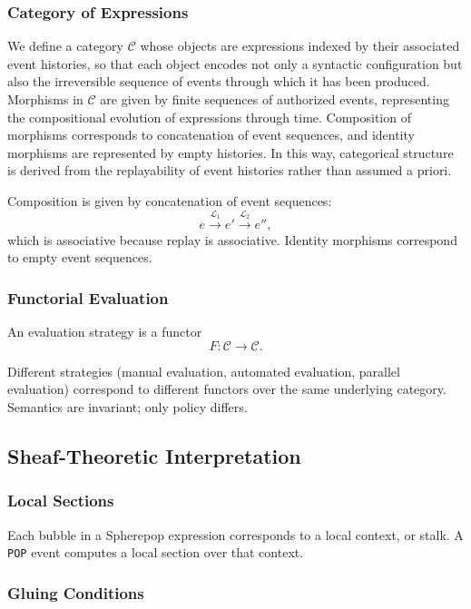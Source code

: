 \documentclass[11pt]{article}
\begin{document}
\subsubsection{Category of Expressions}

We define a category $\mathcal{C}$ whose objects are expressions indexed by their associated event histories, so that each object encodes not only a syntactic configuration but also the irreversible sequence of events through which it has been produced. Morphisms in $\mathcal{C}$ are given by finite sequences of authorized events, representing the compositional evolution of expressions through time. Composition of morphisms corresponds to concatenation of event sequences, and identity morphisms are represented by empty histories. In this way, categorical structure is derived from the replayability of event histories rather than assumed a priori.

Composition is given by concatenation of event sequences:
\[
e \xrightarrow{\mathcal{L}_1} e' \xrightarrow{\mathcal{L}_2} e'',
\]
which is associative because replay is associative. Identity morphisms correspond to empty event sequences.

\subsubsection{Functorial Evaluation}

An evaluation strategy is a functor
\[
F : \mathcal{C} \to \mathcal{C}.
\]

Different strategies (manual evaluation, automated evaluation, parallel evaluation) correspond to different functors over the same underlying category. Semantics are invariant; only policy differs.

\subsection{Sheaf-Theoretic Interpretation}

\subsubsection{Local Sections}

Each bubble in a Spherepop expression corresponds to a local context, or stalk. A \texttt{POP} event computes a local section over that context.

\subsubsection{Gluing Conditions}
\end{document}

